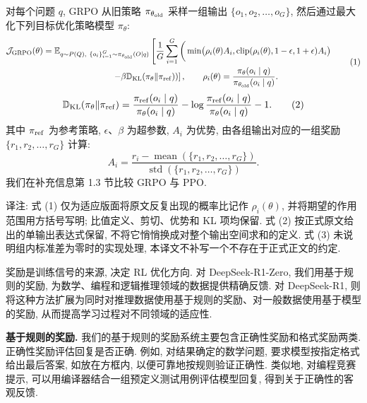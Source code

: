 对每个问题 $q$, GRPO 从旧策略 $\pi_{\theta_{\rm old}}$ 采样一组输出 $\{o_1,o_2,\ldots,o_G\}$, 然后通过最大化下列目标优化策略模型 $\pi_\theta$:
\begin{equation}\label{r1n-eq1}
\begin{aligned}
\mathcal J_{\rm GRPO}(\theta)
&=\mathbb E_{\substack{q\sim P(Q),\ \{o_i\}_{i=1}^G\sim\pi_{\theta_{\rm old}}(O\mid q)}}
\left[\frac1G\sum_{i=1}^G\left(\vphantom{\frac{\pi_\theta(o_i\mid q)}{\pi_{\theta_{\rm old}}(o_i\mid q)}}
\min\bigl(\rho_i(\theta)A_i,
\operatorname{clip}(\rho_i(\theta),1-\epsilon,1+\epsilon)A_i\bigr)\right.\right.\\[-1pt]
&\hspace{8em}\left.\left.-\beta\mathbb D_{\rm KL}(\pi_\theta\Vert\pi_{\rm ref})\right)\right],
\qquad
\rho_i(\theta)=\frac{\pi_\theta(o_i\mid q)}{\pi_{\theta_{\rm old}}(o_i\mid q)}.
\end{aligned}\tag{1}
\end{equation}
\begin{equation}\label{r1n-eq2}
\mathbb D_{\rm KL}(\pi_\theta\Vert\pi_{\rm ref})
=\frac{\pi_{\rm ref}(o_i\mid q)}{\pi_\theta(o_i\mid q)}
-\log\frac{\pi_{\rm ref}(o_i\mid q)}{\pi_\theta(o_i\mid q)}-1.
\tag{2}
\end{equation}
其中 $\pi_{\rm ref}$ 为参考策略, $\epsilon$、$\beta$ 为超参数, $A_i$ 为优势, 由各组输出对应的一组奖励 $\{r_1,r_2,\ldots,r_G\}$ 计算:
\begin{equation}\label{r1n-eq3}
A_i=\frac{r_i-\operatorname{mean}(\{r_1,r_2,\ldots,r_G\})}
{\operatorname{std}(\{r_1,r_2,\ldots,r_G\})}.
\tag{3}
\end{equation}
我们在补充信息第 1.3 节比较 GRPO 与 PPO.

\begin{remark}
译注: 式 (1) 仅为适应版面将原文反复出现的概率比记作 $\rho_i(\theta)$, 并将期望的作用范围用方括号写明; 比值定义、剪切、优势和 KL 项均保留. 式 (2) 按正式原文给出的单输出表达式保留, 不将它悄悄换成对整个输出空间求和的定义. 式 (3) 未说明组内标准差为零时的实现处理, 本译文不补写一个不存在于正式正文的约定.
\end{remark}

\label{r1n-methods-rewards}
奖励是训练信号的来源, 决定 RL 优化方向. 对 DeepSeek-R1-Zero, 我们用基于规则的奖励, 为数学、编程和逻辑推理领域的数据提供精确反馈. 对 DeepSeek-R1, 则将这种方法扩展为同时对推理数据使用基于规则的奖励、对一般数据使用基于模型的奖励, 从而提高学习过程对不同领域的适应性.

\noindent\textbf{基于规则的奖励.} 我们的基于规则的奖励系统主要包含正确性奖励和格式奖励两类. 正确性奖励评估回复是否正确. 例如, 对结果确定的数学问题, 要求模型按指定格式给出最后答案, 如放在方框内, 以便可靠地按规则验证正确性. 类似地, 对编程竞赛提示, 可以用编译器结合一组预定义测试用例评估模型回复, 得到关于正确性的客观反馈.

